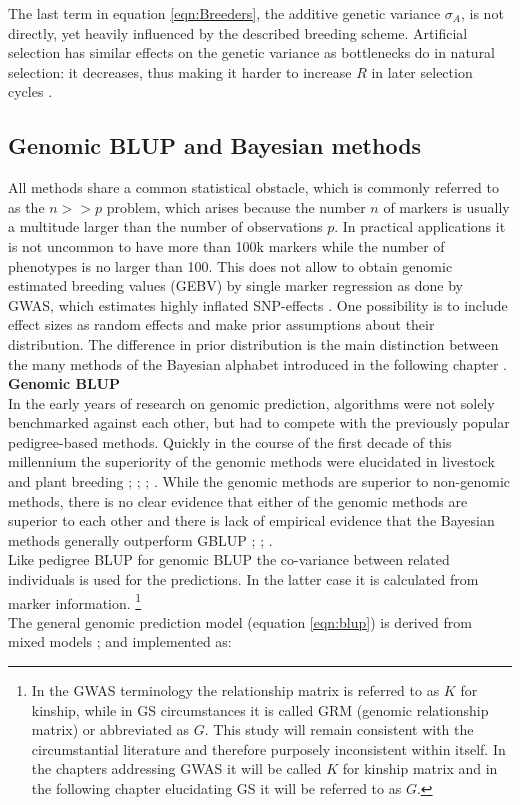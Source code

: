 The last term in equation \ref{eqn:Breeders}, the additive genetic variance $\sigma_A$, is
not directly, yet heavily influenced by the described breeding scheme. Artificial
selection has similar effects on the genetic variance as bottlenecks do in natural
selection: it decreases, thus making it harder to increase $R$ in later selection cycles
\cite{walsh2018}.

\subsection{Genomic BLUP and Bayesian methods}\label{blup:bayes}

All methods share a common statistical obstacle, which is commonly referred to as the
$n >> p$ problem, which arises because the number $n$ of markers is usually a multitude
larger than the number of observations $p$. In practical applications it is not uncommon
to have more than 100k markers while the number of phenotypes is no larger than 100. This
does not allow to obtain genomic estimated breeding values (GEBV) by single marker
regression as done by GWAS, which estimates highly inflated SNP-effects
\cite{korte2013advantages}. One possibility is to include effect sizes as random effects
and make prior assumptions about their distribution. The difference in prior distribution
is the main distinction between the many methods of the Bayesian alphabet introduced in
the following chapter \cite{gianola2013}.\\

\noindent
\textbf{Genomic BLUP} \\ In the early years of research on genomic prediction, algorithms
were not solely benchmarked against each other, but had to compete with the previously
popular pedigree-based methods. Quickly in the course of the first decade of this
millennium the superiority of the genomic methods were elucidated in livestock and plant
breeding \cite{habier2007impact}; \cite{vanraden2008efficient};
\cite{vanraden2008reliability}; \cite{harris2009genomic}. While the genomic methods are
superior to non-genomic methods, there is no clear evidence that either of the genomic
methods are superior to each other and there is lack of empirical evidence that the
Bayesian methods generally outperform
GBLUP \cite{moser2009comparison}; \cite{bernardo2010breeding}; \cite{azodi2019}. \\
Like pedigree BLUP for genomic BLUP the co-variance between related individuals is used
for the predictions. In the latter case it is calculated from marker information.
\footnote{In the GWAS terminology the relationship matrix is referred to as $K$ for
  kinship, while in GS circumstances it is called GRM (genomic relationship matrix) or
  abbreviated as $G$. This study will remain consistent with the circumstantial literature
  and therefore purposely inconsistent within itself. In the chapters addressing GWAS it
  will be called $K$ for kinship matrix and in the following chapter elucidating GS it
  will be referred to as $G$.}
\\
The general genomic prediction model (equation \ref{eqn:blup}) is derived from mixed
models \cite{henderson1975best}; \cite{vanraden2008efficient} and implemented as:


